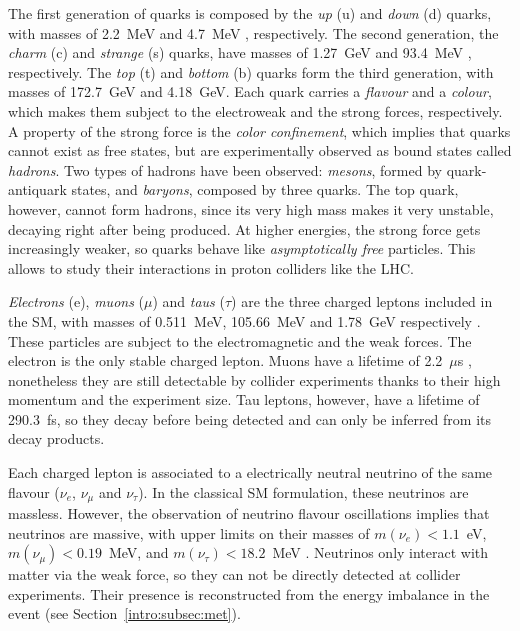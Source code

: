 \documentclass[../main.tex]{subfiles}
\begin{document}
The first generation of quarks is composed by the \textit{up} (u) and \textit{down} (d) quarks, with masses of 2.2~MeV and 4.7~MeV \cite{pdg}, respectively. The second generation, the \textit{charm} (c) and \textit{strange} (s) quarks, have masses of 1.27~GeV and 93.4~MeV \cite{pdg}, respectively. The \textit{top} (t) and \textit{bottom} (b) quarks form the third generation, with masses of 172.7~GeV and 4.18~GeV. Each quark carries a \textit{flavour} and a \textit{colour}, which makes them subject to the electroweak and the strong forces, respectively. A property of the strong force is the \textit{color confinement}, which implies that quarks cannot exist as free states, but are experimentally observed as bound states called \textit{hadrons}. Two types of hadrons have been observed: \textit{mesons}, formed by quark-antiquark states, and \textit{baryons}, composed by three quarks. The top quark, however, cannot form hadrons, since its very high mass makes it very unstable, decaying right after being produced. At higher energies, the strong force gets increasingly weaker, so quarks behave like \textit{asymptotically free} particles. This allows to study their interactions in proton colliders like the LHC.


\textit{Electrons} (e), \textit{muons} ($\mu$) and \textit{taus} ($\tau$) are the three charged leptons included in the SM, with masses of 0.511~MeV, 105.66~MeV and 1.78~GeV respectively \cite{pdg}. These particles are subject to the electromagnetic and the weak forces. The electron is the only stable charged lepton. Muons have a lifetime of 2.2~$\mu$s \cite{pdg}, nonetheless they are still detectable by collider experiments thanks to their high momentum and the experiment size. Tau leptons, however, have a lifetime of 290.3~fs, so they decay before being detected and can only be inferred from its decay products.

Each charged lepton is associated to a electrically neutral neutrino of the same flavour ($\nu_e$, $\nu_\mu$ and $\nu_\tau$). In the classical SM formulation, these neutrinos are massless. However, the observation of neutrino flavour oscillations \cite{intro:theo:nu_oscillations} implies that neutrinos are massive, with upper limits on their masses of $m(\nu_e)<1.1$~eV, $m(\nu_\mu)<0.19$~MeV, and $m(\nu_\tau)<18.2$~MeV \cite{pdg}. Neutrinos only interact with matter via the weak force, so they can not be directly detected at collider experiments. Their presence is reconstructed from the energy imbalance in the event (see Section~\ref{intro:subsec:met}).
\end{document}
